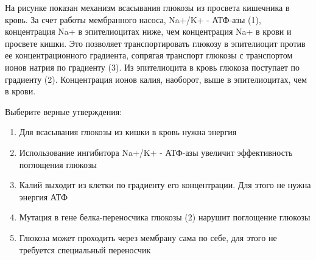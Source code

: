 
На рисунке показан механизм
всасывания глюкозы из просвета кишечника в кровь. За счет работы мембранного
насоса,  Na+/K+ -
АТФ-азы (1), концентрация Na+ в эпителиоцитах ниже, чем концентрация
Na+  в крови и просвете кишки.
Это позволяет транспортировать глюкозу в эпителиоцит против ее
концентрационного градиента, сопрягая транспорт глюкозы с транспортом ионов
натрия по градиенту (3). Из эпителиоцита в кровь глюкоза поступает по градиенту
(2). Концентрация ионов калия, наоборот, выше в эпителиоцитах, чем в крови.
 

Выберите верные утверждения:

\begin{enumerate}
    \item Для всасывания глюкозы из кишки в кровь нужна энергия
    \item Использование ингибитора Na+/K+ - АТФ-азы увеличит эффективность поглощения глюкозы
    \item Калий выходит из клетки по градиенту его концентрации. Для этого не нужна энергия АТФ
    \item Мутация в гене белка-переносчика глюкозы (2) нарушит поглощение глюкозы
    \item Глюкоза может проходить через мембрану сама по себе, для этого не требуется специальный переносчик
\end{enumerate}

